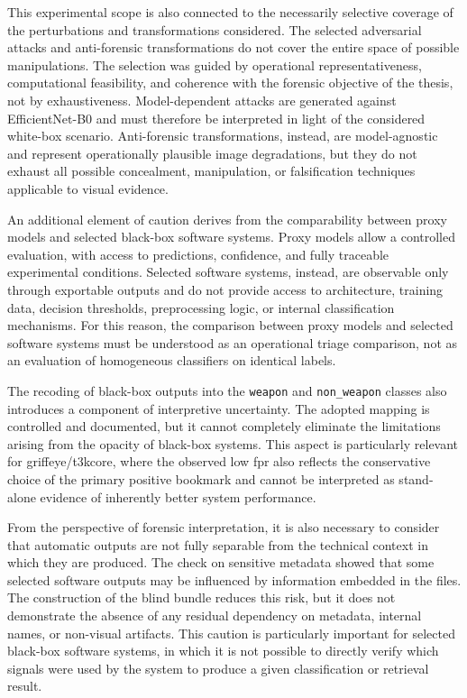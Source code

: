 This experimental scope is also connected to the necessarily selective coverage
of the perturbations and transformations considered. The selected adversarial
attacks and anti-forensic transformations do not cover the entire space of
possible manipulations. The selection was guided by operational
representativeness, computational feasibility, and coherence with the forensic
objective of the thesis, not by exhaustiveness. Model-dependent attacks are
generated against EfficientNet-B0 and must therefore be interpreted in light of
the considered white-box scenario. Anti-forensic transformations, instead, are
model-agnostic and represent operationally plausible image degradations, but
they do not exhaust all possible concealment, manipulation, or falsification
techniques applicable to visual evidence.

An additional element of caution derives from the comparability between proxy
models and selected black-box software systems. Proxy models allow a controlled
evaluation, with access to predictions, confidence, and fully traceable
experimental conditions. Selected software systems, instead, are observable only
through exportable outputs and do not provide access to architecture, training
data, decision thresholds, preprocessing logic, or internal classification
mechanisms. For this reason, the comparison between proxy models and selected
software systems must be understood as an operational triage comparison, not as
an evaluation of homogeneous classifiers on identical labels.

The recoding of black-box outputs into the \texttt{weapon} and
\texttt{non\_weapon} classes also introduces a component of interpretive
uncertainty. The adopted mapping is controlled and documented, but it cannot
completely eliminate the limitations arising from the opacity of black-box
systems. This aspect is particularly relevant for
\gls{griffeye}/\gls{t3kcore}, where the observed low \gls{fpr} also reflects
the conservative choice of the primary positive bookmark and cannot be
interpreted as stand-alone evidence of inherently better system performance.

From the perspective of forensic interpretation, it is also necessary to
consider that automatic outputs are not fully separable from the technical
context in which they are produced. The check on sensitive metadata showed that
some selected software outputs may be influenced by information embedded in the
files. The construction of the blind bundle reduces this risk, but it does not
demonstrate the absence of any residual dependency on metadata, internal names,
or non-visual artifacts. This caution is particularly important for selected
black-box software systems, in which it is not possible to directly verify
which signals were used by the system to produce a given classification or
retrieval result.

